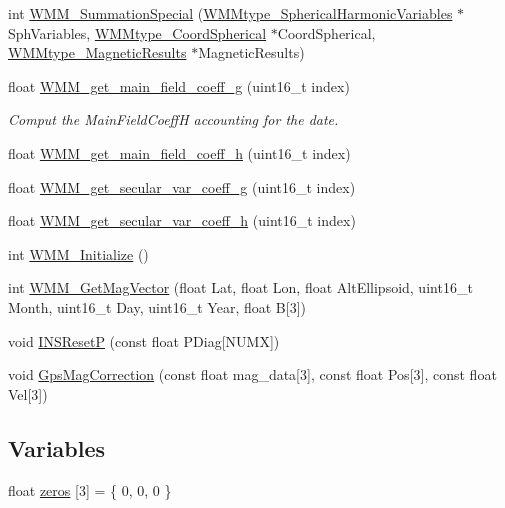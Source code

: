 \begin{DoxyCompactItemize}
\item 
int \hyperlink{group___tau_labs_libraries_gac7da42c5f969106eb3d552d2e616df94}{\-W\-M\-M\-\_\-\-Summation\-Special} (\hyperlink{struct_w_m_mtype___spherical_harmonic_variables}{\-W\-M\-Mtype\-\_\-\-Spherical\-Harmonic\-Variables} $\ast$\-Sph\-Variables, \hyperlink{struct_w_m_mtype___coord_spherical}{\-W\-M\-Mtype\-\_\-\-Coord\-Spherical} $\ast$\-Coord\-Spherical, \hyperlink{struct_w_m_mtype___magnetic_results}{\-W\-M\-Mtype\-\_\-\-Magnetic\-Results} $\ast$\-Magnetic\-Results)
\item 
float \hyperlink{group___tau_labs_libraries_ga751ca9b09519898686ec126761fe776a}{\-W\-M\-M\-\_\-get\-\_\-main\-\_\-field\-\_\-coeff\-\_\-g} (uint16\-\_\-t index)
\begin{DoxyCompactList}\small\item\em \-Comput the \-Main\-Field\-Coeff\-H accounting for the date. \end{DoxyCompactList}\item 
float \hyperlink{group___tau_labs_libraries_gae9cebe39726f1469ca14fb66311d266c}{\-W\-M\-M\-\_\-get\-\_\-main\-\_\-field\-\_\-coeff\-\_\-h} (uint16\-\_\-t index)
\item 
float \hyperlink{group___tau_labs_libraries_ga92c8dce6ab0d9bc670c2e62dd5494f95}{\-W\-M\-M\-\_\-get\-\_\-secular\-\_\-var\-\_\-coeff\-\_\-g} (uint16\-\_\-t index)
\item 
float \hyperlink{group___tau_labs_libraries_ga858aac8dd5a17c59d462a5f7ac5c0132}{\-W\-M\-M\-\_\-get\-\_\-secular\-\_\-var\-\_\-coeff\-\_\-h} (uint16\-\_\-t index)
\item 
int \hyperlink{group___tau_labs_libraries_ga03835b784549965af0e70b875e08cae1}{\-W\-M\-M\-\_\-\-Initialize} ()
\item 
int \hyperlink{group___tau_labs_libraries_ga241f797f133a9e48ef8c3e57f3d1106d}{\-W\-M\-M\-\_\-\-Get\-Mag\-Vector} (float \-Lat, float \-Lon, float \-Alt\-Ellipsoid, uint16\-\_\-t \-Month, uint16\-\_\-t \-Day, uint16\-\_\-t \-Year, float \-B\mbox{[}3\mbox{]})
\item 
void \hyperlink{group___tau_labs_libraries_ga6f92f7117413395897c8c6cc180da4d9}{\-I\-N\-S\-Reset\-P} (const float \-P\-Diag\mbox{[}\-N\-U\-M\-X\mbox{]})
\item 
void \hyperlink{group___tau_labs_libraries_ga8260b6cbf756639068fe6ea734c5662d}{\-Gps\-Mag\-Correction} (const float mag\-\_\-data\mbox{[}3\mbox{]}, const float \-Pos\mbox{[}3\mbox{]}, const float \-Vel\mbox{[}3\mbox{]})
\end{DoxyCompactItemize}
\subsection*{\-Variables}
\begin{DoxyCompactItemize}
\item 
float \hyperlink{group___tau_labs_libraries_ga37df636c79e0bd4b3fab83292679a4b0}{zeros} \mbox{[}3\mbox{]} = \{ 0, 0, 0 \}
\end{DoxyCompactItemize}


